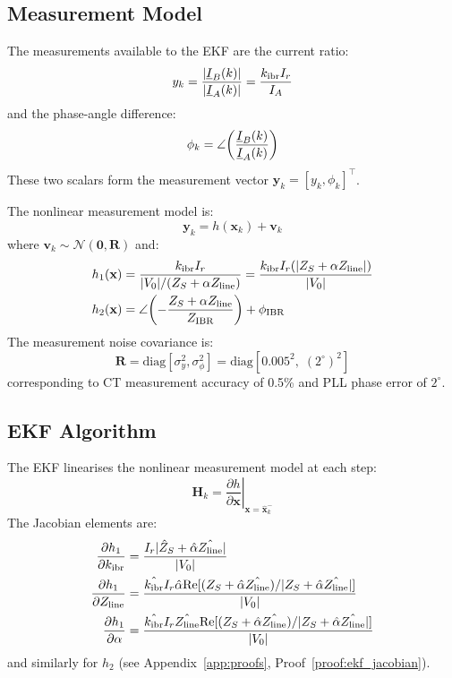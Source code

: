\subsection{Measurement Model}

The measurements available to the EKF are the current ratio:
\begin{equation}
  y_k = \frac{|\underline{I}_B(k)|}{|\underline{I}_A(k)|} = \frac{k_\mathrm{ibr} I_r}{I_A}
  \label{eq:ch7_measurement}
\end{equation}
and the phase-angle difference:
\begin{equation}
  \phi_k = \angle\!\left(\frac{\underline{I}_B(k)}{\underline{I}_A(k)}\right)
  \label{eq:ch7_phase_meas}
\end{equation}
These two scalars form the measurement vector $\mathbf{y}_k = [y_k, \phi_k]^\top$.

The nonlinear measurement model is:
\begin{equation}
  \mathbf{y}_k = h(\mathbf{x}_k) + \mathbf{v}_k
  \label{eq:ch7_obs_model}
\end{equation}
where $\mathbf{v}_k \sim \mathcal{N}(\mathbf{0}, \mathbf{R})$ and:
\begin{align}
  h_1(\mathbf{x}) &= \frac{k_\mathrm{ibr} I_r}{|V_0|/(Z_S + \alpha Z_\mathrm{line})}
  = \frac{k_\mathrm{ibr} I_r (|Z_S + \alpha Z_\mathrm{line}|)}{|V_0|}
  \label{eq:ch7_h1} \\
  h_2(\mathbf{x}) &= \angle\!\left(-\frac{Z_S + \alpha Z_\mathrm{line}}{Z_\mathrm{IBR}}\right)
  + \phi_\mathrm{IBR}
  \label{eq:ch7_h2}
\end{align}
The measurement noise covariance is:
\begin{equation}
  \mathbf{R} = \mathrm{diag}[\sigma_y^2, \sigma_\phi^2]
  = \mathrm{diag}[0.005^2,\; (2^\circ{})^2]
  \label{eq:ch7_R}
\end{equation}
corresponding to CT measurement accuracy of 0.5\% and PLL phase error of $2^\circ$.

\subsection{EKF Algorithm}

The EKF linearises the nonlinear measurement model at each step:
\begin{equation}
  \mathbf{H}_k = \left.\frac{\partial h}{\partial \mathbf{x}}\right|_{\mathbf{x} = \hat{\mathbf{x}}_k^-}
  \label{eq:ch7_jacobian}
\end{equation}
The Jacobian elements are:
\begin{align}
  \frac{\partial h_1}{\partial k_\mathrm{ibr}} &= \frac{I_r |\hat{Z}_S + \hat{\alpha}\hat{Z_\mathrm{line}}|}{|V_0|}
  \label{eq:ch7_jac11} \\
  \frac{\partial h_1}{\partial Z_\mathrm{line}} &= \frac{\hat{k_\mathrm{ibr}} I_r \hat{\alpha}
    \mathrm{Re}[(Z_S + \hat{\alpha}\hat{Z_\mathrm{line}})/|Z_S + \hat{\alpha}\hat{Z_\mathrm{line}}|]}{|V_0|}
  \label{eq:ch7_jac12} \\
  \frac{\partial h_1}{\partial \alpha} &= \frac{\hat{k_\mathrm{ibr}} I_r \hat{Z_\mathrm{line}}
    \mathrm{Re}[(Z_S + \hat{\alpha}\hat{Z_\mathrm{line}})/|Z_S + \hat{\alpha}\hat{Z_\mathrm{line}}|]}{|V_0|}
  \label{eq:ch7_jac13}
\end{align}
and similarly for $h_2$ (see Appendix~\ref{app:proofs}, Proof~\ref{proof:ekf_jacobian}).

